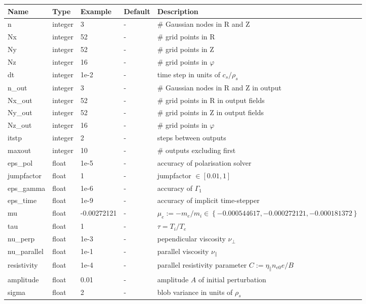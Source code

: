\documentclass{hitec} %
\begin{document}
\begin{longtable}{llll>{\RaggedRight}p{7cm}}
\toprule
\rowcolor{gray!50}\textbf{Name} &  \textbf{Type} & \textbf{Example} & \textbf{Default} & \textbf{Description}  \\ \midrule
n      & integer & 3 & - &\# Gaussian nodes in R and Z \\
Nx     & integer &52& - &\# grid points in R \\
Ny     & integer &52& - &\# grid points in Z \\
Nz     & integer &16& - &\# grid points in $\varphi$ \\
dt     & integer &1e-2& - &time step in units of $c_s/\rho_s$ \\
n\_out  & integer &3  & - &\# Gaussian nodes in R and Z in output \\
Nx\_out & integer &52& - &\# grid points in R in output fields \\
Ny\_out & integer &52& - &\# grid points in Z in output fields \\
Nz\_out & integer &16& - &\# grid points in $\varphi$ \\
itstp  & integer &2  & - &   steps between outputs \\
maxout & integer &10& - &      \# outputs excluding first \\
eps\_pol   & float &1e-5    & - &  accuracy of polarisation solver \\
jumpfactor & float &1& - &     jumpfactor $\in \left[0.01,1\right]$\\
eps\_gamma & float &1e-6    & - & accuracy of $\Gamma_1$  \\
eps\_time  & float &1e-9   & - & accuracy of implicit time-stepper \\
mu         & float & -0.00272121& - & $\mu_e :=-m_e/m_i \in \left\{ -0.000544617, -0.000272121, -0.000181372 \right\}$\\
tau        & float &1      & - & $\tau = T_i/T_e$  \\
nu\_perp   & float &1e-3   & - & pependicular viscosity $\nu_\perp$ \\
nu\_parallel & float &1e-1 & - & parallel viscosity $\nu_\parallel$ \\
resistivity & float &1e-4  & - & parallel resistivity parameter $C:= \eta_\parallel n_{e0} e/B $ \\
amplitude  & float &0.01   & - & amplitude $A$ of initial perturbation \\
sigma      & float &2      & - & blob variance in units of $\rho_s$ \\

\end{longtable}
\end{document}
